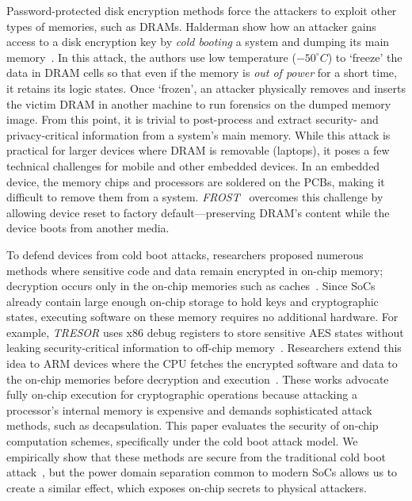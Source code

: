 Password-protected disk encryption methods force the attackers to exploit other types of memories, such as DRAMs. 
Halderman \etal show how an attacker gains access to a disk encryption key by \textit{cold booting} a system and dumping its main memory~\cite{halderman2009lest}. 
In this attack, the authors use low temperature ($-50^\circ C$) to `freeze' the data in DRAM cells so that even if the memory is \textit{out of power} for a short time, it retains its logic states.   
Once `frozen', an attacker physically removes and inserts the victim DRAM in another machine to run forensics on the dumped memory image. From this point, it is trivial to post-process and extract security- and privacy-critical information from a system's main memory. 
While this attack is practical for larger devices where DRAM is removable (\eg laptops), it poses a few technical challenges for mobile and other embedded devices. 
In an embedded device, the memory chips and processors are soldered on the PCBs, making it difficult to remove them from a system. \textit{FROST}~\cite{frost_2013} overcomes this challenge by allowing device reset to factory default---preserving DRAM's content while the device boots from another media. 


To defend devices from cold boot attacks, researchers proposed numerous methods where sensitive code and data remain encrypted in on-chip memory;
decryption occurs only in the on-chip memories such as caches~\cite{TRESOR_2011, zhang2016case}.
Since SoCs already contain large enough on-chip storage to hold keys and cryptographic states, executing software on these memory requires no additional hardware.  
For example, \textit{TRESOR} uses x86 debug registers to store sensitive AES states without leaking security-critical information to off-chip memory~\cite{TRESOR_2011}. 
Researchers extend this idea to ARM devices where the CPU fetches the encrypted software and data to the on-chip memories before decryption and execution~\cite{Sentry,chu2019ocram,PRIME_RSA_implementation_on_chip,guan2014copker,zhang2016case, sec_through_amnesia}.
These works advocate fully on-chip execution for cryptographic operations because attacking a processor's internal memory is expensive and demands sophisticated attack methods, such as decapsulation. 
This paper evaluates the security of on-chip computation schemes, specifically under the cold boot attack model.
We empirically show that these methods are secure from the traditional cold boot attack~\cite{halderman2009lest}, but the power domain separation common to modern SoCs allows us to create a similar effect, 
which exposes on-chip secrets to physical attackers.


